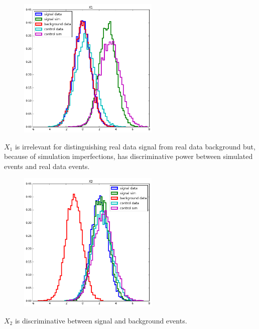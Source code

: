 \documentclass{beamer}
\begin{document}
\begin{frame}

\begin{figure}
\centering
\includegraphics[width=0.6\textwidth]{x1.png}
\end{figure}

$X_1$ is irrelevant for distinguishing real data signal from real data
background but, because of simulation imperfections, has discriminative power
between simulated events and real data events.

\end{frame}

\begin{frame}

\begin{figure}
\centering
\includegraphics[width=0.6\textwidth]{x2.png}
\end{figure}

$X_2$ is discriminative between signal and background events.

\end{frame}
\end{document}
